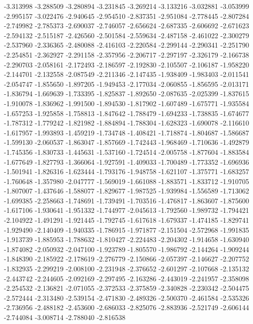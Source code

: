 -3.313998
-3.288509
-3.280894
-3.231845
-3.269214
-3.133216
-3.032881
-3.053999
-2.995157
-3.022476
-2.940645
-2.954510
-2.837351
-2.951084
-2.778445
-2.807284
-2.749982
-2.785373
-2.690037
-2.746057
-2.656624
-2.687335
-2.606692
-2.671623
-2.594132
-2.515187
-2.426560
-2.501584
-2.559634
-2.487158
-2.461022
-2.300279
-2.537960
-2.336365
-2.480088
-2.416103
-2.220584
-2.299144
-2.290341
-2.251790
-2.254851
-2.362927
-2.291158
-2.357956
-2.206717
-2.297197
-2.326179
-2.166738
-2.290703
-2.058161
-2.172493
-2.186597
-2.192830
-2.105507
-2.106187
-1.958220
-2.144701
-2.132558
-2.087549
-2.211346
-2.147435
-1.938409
-1.983403
-2.011541
-2.054747
-1.855650
-1.897205
-1.949453
-2.177034
-2.060855
-1.856595
-2.013171
-1.836794
-1.669639
-1.733395
-1.825837
-1.892650
-2.087635
-2.025399
-1.837615
-1.910078
-1.836962
-1.991500
-1.894530
-1.817902
-1.607489
-1.675771
-1.935584
-1.657253
-1.925858
-1.758813
-1.847642
-1.788479
-1.694233
-1.738835
-1.674677
-1.787312
-1.779242
-1.821982
-1.884894
-1.788304
-1.628323
-1.690078
-2.116610
-1.617957
-1.993893
-1.459219
-1.734748
-1.408421
-1.718874
-1.804687
-1.586687
-1.599130
-2.060537
-1.863047
-1.857669
-1.742443
-1.968469
-1.710636
-1.492879
-1.745356
-1.830733
-1.445631
-1.537160
-1.724514
-2.005758
-1.877604
-1.883584
-1.677649
-1.827793
-1.366064
-1.927591
-1.409033
-1.700489
-1.773352
-1.696936
-1.501941
-1.826316
-1.623444
-1.793176
-1.948758
-1.621107
-1.375771
-1.683257
-1.760648
-1.357980
-2.047777
-1.569019
-1.661088
-1.883571
-1.833712
-1.910705
-1.807007
-1.437646
-1.588077
-1.829677
-1.987525
-1.939984
-1.556589
-1.713062
-1.699385
-2.258663
-1.748691
-1.739491
-1.703516
-1.476817
-1.863607
-1.875600
-1.617106
-1.930641
-1.951332
-1.744977
-2.045613
-1.792560
-1.989732
-1.794421
-2.104922
-1.491291
-1.921445
-1.792745
-1.617618
-1.679337
-1.474185
-1.829741
-1.929490
-2.140409
-1.940335
-1.786915
-1.971877
-2.151504
-2.572968
-1.991835
-1.913739
-1.885953
-1.788632
-1.810427
-2.224483
-2.204302
-1.914658
-1.630940
-1.874082
-2.050932
-2.047100
-1.923789
-1.805570
-1.986792
-2.144264
-1.909244
-1.848390
-2.185922
-2.178619
-2.276779
-2.150866
-2.057397
-2.146627
-2.207752
-1.832935
-2.299219
-2.008100
-2.231948
-2.376652
-2.601297
-2.107668
-2.135132
-2.443742
-2.244605
-2.092169
-2.297495
-2.163286
-2.443019
-2.241957
-2.358098
-2.254532
-2.136821
-2.071055
-2.372533
-2.375859
-2.340828
-2.230342
-2.504475
-2.572444
-2.313480
-2.539154
-2.471830
-2.489326
-2.500370
-2.461584
-2.535326
-2.736956
-2.488182
-2.453600
-2.686033
-2.825076
-2.883936
-2.521749
-2.606144
-2.744084
-3.008714
-2.788040
-2.816538
